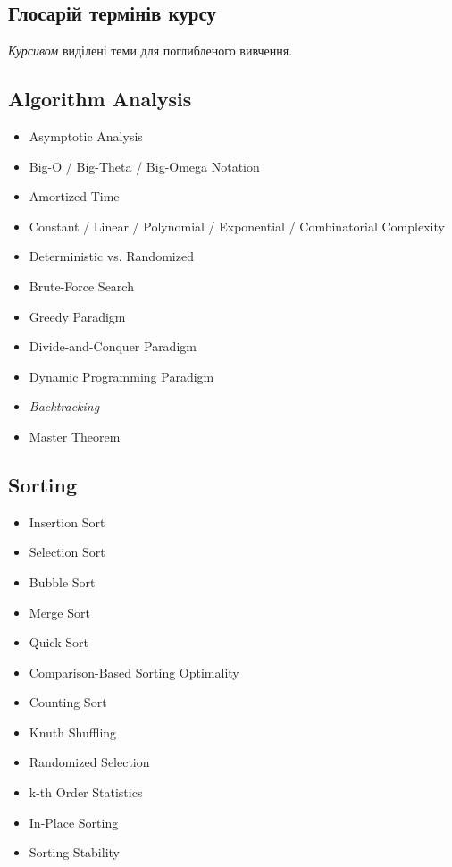 \documentclass[10pt,a4paper]{article}
\begin{document}
\begin{landscape}


\section*{Глосарій термінів курсу}
\textit{Курсивом} виділені теми для поглибленого вивчення.


\begin{multicols*}{4}

\subsection*{Algorithm Analysis}
\begin{itemize}
    \item Asymptotic Analysis
    \item Big-O / Big-Theta / Big-Omega Notation
    \item Amortized Time
    \item Constant / Linear / Polynomial / Exponential / Combinatorial Complexity
    \item Deterministic vs. Randomized
    \item Brute-Force Search
    \item Greedy Paradigm
    \item Divide-and-Conquer Paradigm
    \item Dynamic Programming Paradigm
    \item \textit{Backtracking}
    \item Master Theorem
\end{itemize}

\subsection*{Sorting}
\begin{itemize}
    \item Insertion Sort
    \item Selection Sort
    \item Bubble Sort
    \item Merge Sort
    \item Quick Sort
    \item Comparison-Based Sorting Optimality
    \item Counting Sort
    \item Knuth Shuffling
    \item Randomized Selection
    \item k-th Order Statistics
    \item In-Place Sorting
    \item Sorting Stability
\end{itemize}


\end{multicols*}
\end{landscape}
\end{document}
